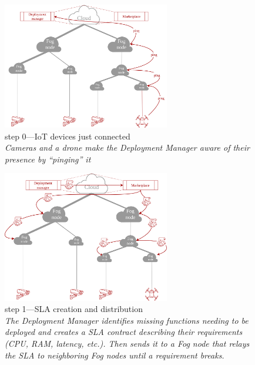 \begin{figure}[H]
	\centering
	\includegraphics[width=0.65\textwidth]{./assets/OurPlacementOriginal-Page-1.png}
	\caption[Step 0—\gls{IoT} devices just connected]{step 0—\gls{IoT} devices just connected\\
		\textit{Cameras and a drone make the Deployment Manager aware of their presence by “pinging” it}}
	\label{fig:our_placement0}
\end{figure}
\begin{figure}[H]
	\centering
	\includegraphics[width=0.65\textwidth]{./assets/OurPlacementOriginal-Page-2.png}
	\caption[Step 1—\gls{SLA} creation and distribution]{step 1—\gls{SLA} creation and distribution\\
		\textit{The Deployment Manager identifies missing functions needing to be deployed and creates a \gls{SLA} contract describing their requirements (CPU, RAM, latency, etc.). Then sends it to a Fog node that relays the \gls{SLA} to neighboring Fog nodes until a requirement breaks.}}
	\label{fig:our_placement1}
\end{figure}
